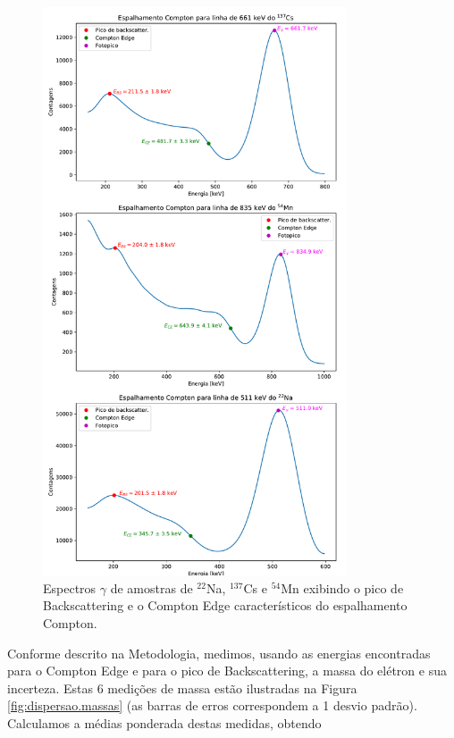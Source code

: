 \documentclass[a4paper, 11pt, notitlepage]{article}
\numberwithin{equation}{section}  %
\begin{document}
\begin{figure}[H]
\centering
  \includegraphics[width=0.8\textwidth]{plots_compton}
  \caption{Espectros $\gamma$ de amostras de ${}^{22}$Na, ${}^{137}$Cs e ${}^{54}$Mn exibindo o pico de Backscattering e o Compton Edge característicos do espalhamento Compton.}
  \label{fig:espectros.compton}
\end{figure}

Conforme descrito na Metodologia, medimos, usando as energias encontradas para o Compton Edge e para o pico de Backscattering, a massa do elétron e sua incerteza. Estas 6 medições de massa estão ilustradas na Figura \ref{fig:dispersao.massas} (as barras de erros correspondem a 1 desvio padrão). Calculamos a médias ponderada destas medidas, obtendo
\end{document}
